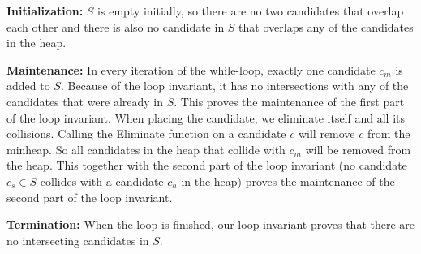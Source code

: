 \documentclass[crop=false,a4paper,oneside,11pt]{article}
\begin{document}
\textbf{Initialization:} $S$ is empty initially, so there are no two candidates that overlap each other and there is also no candidate in $S$ that overlaps any of the candidates in the heap.

\textbf{Maintenance:} In every iteration of the while-loop, exactly one candidate $c_m$ is added to $S$. Because of the loop invariant, it has no intersections with any of the candidates that were already in $S$. This proves the maintenance of the first part of the loop invariant. When placing the candidate, we eliminate itself and all its collisions. Calling the Eliminate function on a candidate $c$ will remove $c$ from the minheap. So all candidates in the heap that collide with $c_m$ will be removed from the heap. This together with the second part of the loop invariant (no candidate $c_s\in S$ collides with a candidate $c_h$ in the heap) proves the maintenance of the second part of the loop invariant.

\textbf{Termination:} When the loop is finished, our loop invariant proves that there are no intersecting candidates in $S$.
\end{document}
